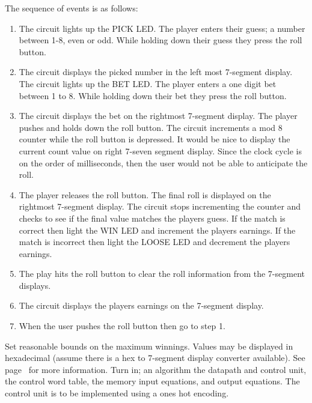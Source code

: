\begin{enumerate}
        The sequence of events is as follows:
        \begin{enumerate}
            \item    The circuit lights up the PICK LED.
                The player enters their guess; a number between 1-8, even or odd.
                While holding down their guess they press the roll button.
            \item    The circuit displays the picked number in the left most
                7-segment display.  The circuit lights up the BET LED.
                The player enters a one digit bet between 1 to 8.  While holding
                down their bet they press the roll button.
            \item     The circuit displays the bet on the rightmost 7-segment
                display.
                The player pushes and holds down the roll button.
                The circuit increments a mod 8 counter while the roll
                button is depressed. It would be nice to display the
                current count value on right 7-seven segment display.
                Since the clock cycle is on the order of milliseconds,
                then the user would not be able to anticipate the roll.
            \item    The player releases the roll button.  The final roll
                is displayed on the rightmost 7-segment display.
                The circuit stops incrementing the counter and checks
                to see if the final value matches the players guess.
                If the match is correct then light the WIN LED and
                increment the players earnings.  If the match is incorrect
                then light the LOOSE LED and decrement the players
                earnings.
            \item    The play hits the roll button to clear the roll information
                from the 7-segment displays.
            \item    The circuit displays the players earnings on the 7-segment
                display.
            \item    When the user pushes the roll button then go to step 1.
        \end{enumerate}

        Set reasonable bounds on the maximum winnings.  Values may be displayed
        in hexadecimal (assume there is a hex to 7-segment display converter
        available).  See page~\pageref{page:7seg} for more
        information.
        Turn in; an algorithm the datapath and control unit, the control word
        table, the memory input equations, and output equations.
        The control unit is to be implemented using a ones hot encoding.


\end{enumerate}
